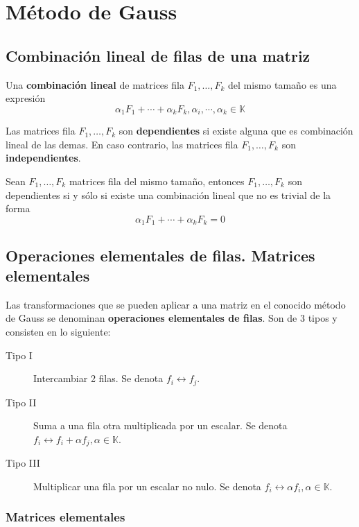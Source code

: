 \section{Método de Gauss}

\subsection{Combinación lineal de filas de una matriz}

Una \textbf{combinación lineal} de matrices fila $F_1,\ldots,F_k$ del mismo tamaño es una expresión
\[
 \alpha_1 F_1 + \cdots + \alpha_k F_k, \alpha_i,\cdots,\alpha_k \in \mathbb{K}
\]

Las matrices fila $F_1,\ldots,F_k$ son \textbf{dependientes} si existe alguna que es combinación lineal de las demas. 
En caso contrario, las matrices fila $F_1,\ldots,F_k$ son \textbf{independientes}.


 Sean $F_1,\ldots,F_k$ matrices fila del mismo tamaño, entonces $F_1,\ldots,F_k$ son dependientes si y sólo si existe
 una combinación lineal que no es trivial de la forma
\[
 \alpha_1 F_1 + \cdots + \alpha_k F_k = 0
\] 


\subsection{Operaciones elementales de filas. Matrices elementales}

Las transformaciones que se pueden aplicar a una matriz en el conocido método de Gauss se denominan \textbf{operaciones elementales 
de filas}. Son de 3 tipos y consisten en lo siguiente:
\begin{description}
 \item[Tipo I] Intercambiar 2 filas. Se denota $f_i \leftrightarrow f_j$.
 \item[Tipo II] Suma a una fila otra multiplicada por un escalar. Se denota 
$f_i \leftrightarrow f_i + \alpha f_j, \alpha \in \mathbb{K}$.
 \item[Tipo III] Multiplicar una fila por un escalar no nulo. Se denota $f_i  
\leftrightarrow \alpha f_i, \alpha \in \mathbb{K}$.
\end{description}

\subsubsection{Matrices elementales}

